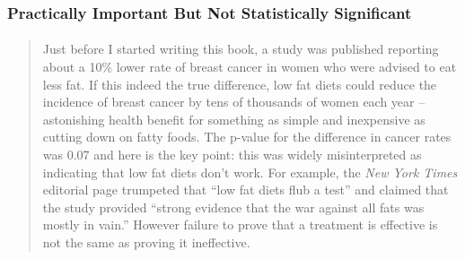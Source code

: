 
\begin{frame}
\frametitle{Practically Important But Not Statistically Significant}
\framesubtitle{\href{http://www.amazon.com/p-value-Stories-Actually-Understand-Statistics/dp/0321629302}{}}
\footnotesize
\begin{quote}
Just before I started writing this book, a study was published reporting about a 10\% lower rate of breast cancer in women who were advised to eat less fat. If this indeed the true difference, low fat diets could reduce the incidence of breast cancer by tens of thousands of women each year -- astonishing health benefit for something as simple and inexpensive as cutting down on fatty foods. The p-value for the difference in cancer rates was 0.07 and here is the key point: this was widely misinterpreted as indicating that low fat diets don't work. For example, the \emph{New York Times} editorial page trumpeted that ``low fat diets flub a test'' and claimed that the study provided ``strong evidence that the war against all fats was mostly in vain.'' \alert{However failure to prove that a treatment is effective is not the same as proving it ineffective.}
\end{quote}
\end{frame}
